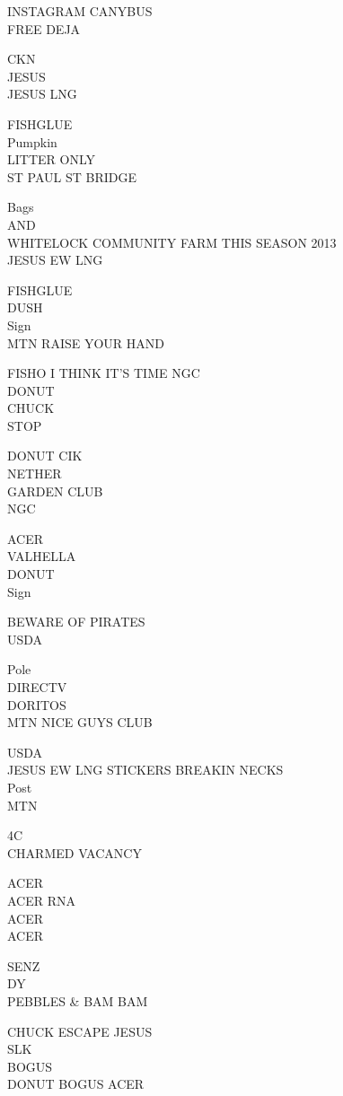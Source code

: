 \documentclass[10pt,letterpaper]{article}
\begin{document}
INSTAGRAM CANYBUS\\
FREE DEJA

CKN\\
JESUS\\
JESUS LNG

FISHGLUE\\
Pumpkin\\
LITTER ONLY\\
ST PAUL ST BRIDGE

Bags\\
AND\\
WHITELOCK COMMUNITY FARM THIS SEASON 2013\\
JESUS EW LNG

FISHGLUE\\
DUSH\\
Sign\\
MTN RAISE YOUR HAND

FISHO I THINK IT'S TIME NGC\\
DONUT\\
CHUCK\\
STOP

DONUT CIK\\
NETHER\\
GARDEN CLUB\\
NGC

ACER\\
VALHELLA\\
DONUT\\
Sign

BEWARE OF PIRATES\\
USDA

Pole\\
DIRECTV\\
DORITOS\\
MTN NICE GUYS CLUB

USDA\\
JESUS EW LNG STICKERS BREAKIN NECKS\\
Post\\
MTN

4C\\
CHARMED VACANCY

ACER\\
ACER RNA\\
ACER\\
ACER

SENZ\\
DY\\
PEBBLES \& BAM BAM

CHUCK ESCAPE JESUS\\
SLK\\
BOGUS\\
DONUT BOGUS ACER
\end{document}
